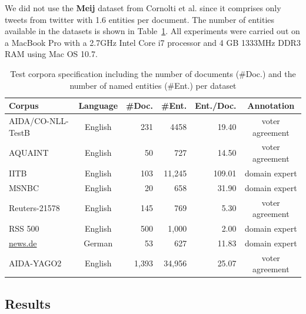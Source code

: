 \documentclass{llncs}
\begin{document}
We did not use the \textbf{Meij} dataset from Cornolti et al. since it comprises only tweets from twitter with 1.6 entities per document. The number of entities available in the datasets is shown in Table~\ref{tab:data}.
All experiments were carried out on a MacBook Pro with a 2.7GHz Intel Core i7 processor and 4 GB 1333MHz DDR3 RAM using Mac OS 10.7. 
\begin{table}[tb!]
\centering
\caption{Test corpora specification including the number of documents (\#Doc.) and the number of named entities (\#Ent.) per dataset}
\label{tab:data}
\begin{tabular}{lcrrrc}
\toprule
\textbf{Corpus} & \textbf{Language} & \textbf{\#Doc.} & \textbf{\#Ent.} & \textbf{Ent./Doc.} & \textbf{Annotation}\\
\midrule
AIDA/CO-NLL-TestB  & English & 231 & 4458 &19.40& voter agreement\\
AQUAINT & English & 50 & 727 & 14.50 &voter agreement\\
IITB & English & 103 & 11,245 & 109.01 &domain expert\\
MSNBC & English & 20 & 658 &31.90 &domain expert\\
Reuters-21578  & English & 145 & 769 &5.30 &voter agreement\\
RSS 500 & English & 500 & 1,000 & 2.00&domain expert \\
\url{news.de} & German & 53 & 627 & 11.83 &domain expert\\
AIDA-YAGO2 & English & 1,393 & 34,956 &25.07 &voter agreement\\
\bottomrule
\end{tabular}
\end{table}


\subsection{Results}
\label{results}
\end{document}
